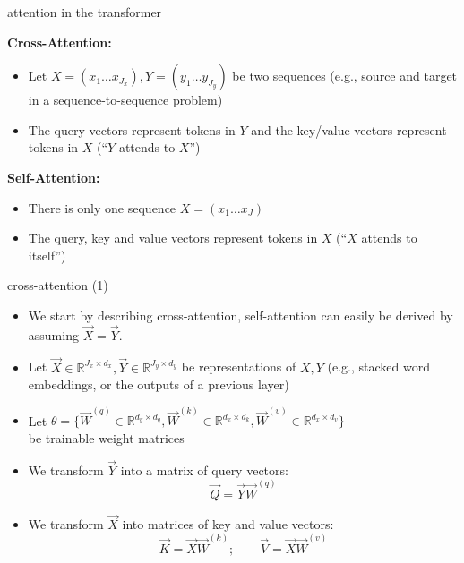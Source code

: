 \documentclass[11pt,compress,t,notes=noshow, xcolor=table]{beamer}
\begin{document}

\begin{vbframe}{attention in the transformer}

\vfill

\textbf{Cross-Attention:}
\begin{itemize}
\item Let $X = (x_1 \ldots x_{J_x}), Y = (y_1 \ldots y_{J_y})$ be two sequences (e.g., source and target in a sequence-to-sequence problem)
\item The query vectors represent tokens in $Y$ and the key/value vectors represent tokens in $X$ (``$Y$ attends to $X$'')
\end{itemize}

\medskip\medskip

\textbf{Self-Attention:}
\begin{itemize}
\item There is only one sequence $X = (x_1 \ldots x_J)$
\item The query, key and value vectors represent tokens in $X$ (``$X$ attends to itself'')
\end{itemize}

\vfill

\end{vbframe}


\begin{vbframe}{cross-attention (1)}

\vfill

\begin{itemize}
	\item We start by describing cross-attention, self-attention can easily be derived by assuming $\vec X = \vec Y$. 
	\item Let $\vec X \in \mathbb{R}^{J_x \times d_x}, \vec Y \in \mathbb{R}^{J_y \times d_y}$ be representations of $X, Y$ (e.g., stacked word embeddings, or the outputs of a previous layer)
	\item Let $\theta = \{\vec W^{(q)} \in \mathbb{R}^{d_y \times d_q}, \vec W^{(k)} \in \mathbb{R}^{d_x \times d_k}, \vec W^{(v)} \in \mathbb{R}^{d_x \times d_v}\}$\\ be trainable weight matrices
	\item We transform $\vec Y$ into a matrix of query vectors:
	$$ \vec Q = \vec Y \vec W^{(q)} $$
	\item We transform $\vec X$ into matrices of key and value vectors:
	$$ \vec K = \vec X \vec W^{(k)} ; \qquad \vec V =  \vec X \vec W^{(v)}$$
\end{itemize}

\vfill

\end{vbframe}
\end{document}

